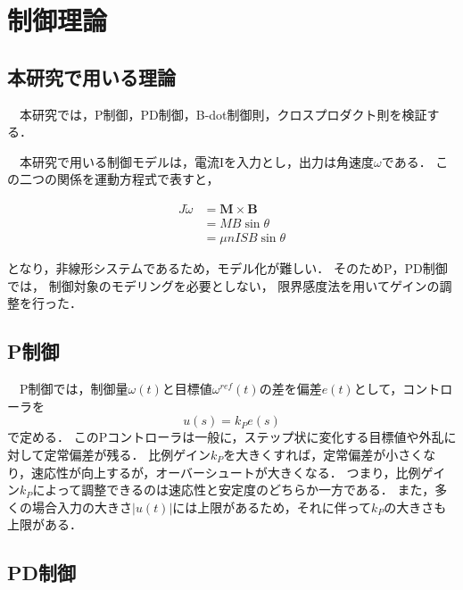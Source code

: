 \section{制御理論}

\subsection{本研究で用いる理論}
　本研究では，P制御，PD制御，B-dot制御則，クロスプロダクト則を検証する．

　本研究で用いる制御モデルは，電流Iを入力とし，出力は角速度$\omega$である．
この二つの関係を運動方程式で表すと，

\begin{equation}
    \begin{aligned}
        J\dot{\omega} &= \boldsymbol{M \times B}\\
                       &= MB\sin\theta\\
                       &= \mu nISB\sin\theta
    \end{aligned}
\end{equation}

となり，非線形システムであるため，モデル化が難しい．
そのためP，PD制御では，
制御対象のモデリングを必要としない，
限界感度法を用いてゲインの調整を行った．



\subsection{P制御}

　P制御では，制御量$\omega(t)$と目標値$\omega^{ref}(t)$の差を偏差$e(t)$として，コントローラを
\begin{equation}
    u(s) = k_Pe(s)
\end{equation}
で定める．
このPコントローラは一般に，ステップ状に変化する目標値や外乱に対して定常偏差が残る．
比例ゲイン$k_P$を大きくすれば，定常偏差が小さくなり，速応性が向上するが，オーバーシュートが大きくなる．
つまり，比例ゲイン$k_P$によって調整できるのは速応性と安定度のどちらか一方である．
また，多くの場合入力の大きさ$|u(t)|$には上限があるため，それに伴って$k_P$の大きさも上限がある．


\subsection{PD制御}

